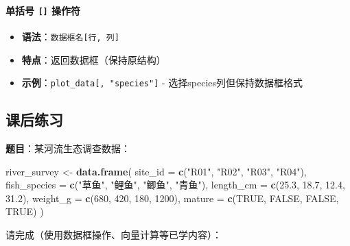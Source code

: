 \documentclass[
]{book}
\newenvironment{Shaded}{\begin{snugshade}}{\end{snugshade}}
\newcommand{\AttributeTok}[1]{\textcolor[rgb]{0.13,0.29,0.53}{#1}}
\newcommand{\ConstantTok}[1]{\textcolor[rgb]{0.56,0.35,0.01}{#1}}
\newcommand{\DecValTok}[1]{\textcolor[rgb]{0.00,0.00,0.81}{#1}}
\newcommand{\FloatTok}[1]{\textcolor[rgb]{0.00,0.00,0.81}{#1}}
\newcommand{\FunctionTok}[1]{\textcolor[rgb]{0.13,0.29,0.53}{\textbf{#1}}}
\newcommand{\NormalTok}[1]{#1}
\newcommand{\OtherTok}[1]{\textcolor[rgb]{0.56,0.35,0.01}{#1}}
\newcommand{\StringTok}[1]{\textcolor[rgb]{0.31,0.60,0.02}{#1}}
\providecommand{\tightlist}{%
  \setlength{\itemsep}{0pt}\setlength{\parskip}{0pt}}
\begin{document}
\hypertarget{ux5355ux62ecux53f7-ux64cdux4f5cux7b26}{%
\paragraph{\texorpdfstring{单括号 \texttt{{[}{]}} 操作符}{单括号 {[}{]} 操作符}}\label{ux5355ux62ecux53f7-ux64cdux4f5cux7b26}}

\begin{itemize}
\tightlist
\item
  \textbf{语法}：\texttt{数据框名{[}行,\ 列{]}}
\item
  \textbf{特点}：返回数据框（保持原结构）
\item
  \textbf{示例}：\texttt{plot\_data{[},\ "species"{]}} - 选择species列但保持数据框格式
\end{itemize}

\hypertarget{ux8bfeux540eux7ec3ux4e60-2}{%
\subsection{课后练习}\label{ux8bfeux540eux7ec3ux4e60-2}}

\textbf{题目}：某河流生态调查数据：

\begin{Shaded}
\begin{Highlighting}[]
\NormalTok{river\_survey }\OtherTok{\textless{}{-}} \FunctionTok{data.frame}\NormalTok{(}
  \AttributeTok{site\_id =} \FunctionTok{c}\NormalTok{(}\StringTok{"R01"}\NormalTok{, }\StringTok{"R02"}\NormalTok{, }\StringTok{"R03"}\NormalTok{, }\StringTok{"R04"}\NormalTok{),}
  \AttributeTok{fish\_species =} \FunctionTok{c}\NormalTok{(}\StringTok{"草鱼"}\NormalTok{, }\StringTok{"鲤鱼"}\NormalTok{, }\StringTok{"鲫鱼"}\NormalTok{, }\StringTok{"青鱼"}\NormalTok{),}
  \AttributeTok{length\_cm =} \FunctionTok{c}\NormalTok{(}\FloatTok{25.3}\NormalTok{, }\FloatTok{18.7}\NormalTok{, }\FloatTok{12.4}\NormalTok{, }\FloatTok{31.2}\NormalTok{),}
  \AttributeTok{weight\_g =} \FunctionTok{c}\NormalTok{(}\DecValTok{680}\NormalTok{, }\DecValTok{420}\NormalTok{, }\DecValTok{180}\NormalTok{, }\DecValTok{1200}\NormalTok{),}
  \AttributeTok{mature =} \FunctionTok{c}\NormalTok{(}\ConstantTok{TRUE}\NormalTok{, }\ConstantTok{FALSE}\NormalTok{, }\ConstantTok{FALSE}\NormalTok{, }\ConstantTok{TRUE}\NormalTok{)}
\NormalTok{)}
\end{Highlighting}
\end{Shaded}

请完成（使用数据框操作、向量计算等已学内容）：
\end{document}
